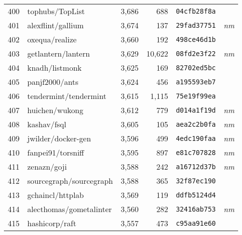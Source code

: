 {\begin{supertabular}{llrrll}
        400 &                    tophubs/TopList &  3,686 &    688 &  \texttt{04cfb28f8a} &              \\
        401 &                  alexflint/gallium &  3,674 &    137 &  \texttt{29fad37751} &  \textit{nm} \\
        402 &                     oxequa/realize &  3,660 &    192 &  \texttt{498ce46d1b} &              \\
        403 &                 getlantern/lantern &  3,629 & 10,622 &  \texttt{08fd2e3f22} &  \textit{nm} \\
        404 &                     knadh/listmonk &  3,625 &    169 &  \texttt{82702ed5bc} &              \\
        405 &                     panjf2000/ants &  3,624 &    456 &  \texttt{a195593eb7} &              \\
        406 &              tendermint/tendermint &  3,615 &  1,115 &  \texttt{75e19f99ea} &              \\
        407 &                     huichen/wukong &  3,612 &    779 &  \texttt{d014a1f19d} &  \textit{nm} \\
        408 &                        kashav/fsql &  3,605 &    105 &  \texttt{aea2c2b0fa} &  \textit{nm} \\
        409 &                 jwilder/docker-gen &  3,596 &    499 &  \texttt{4edc190faa} &  \textit{nm} \\
        410 &                  fanpei91/torsniff &  3,595 &    897 &  \texttt{e81c707828} &  \textit{nm} \\
        411 &                        zenazn/goji &  3,588 &    242 &  \texttt{a16712d37b} &  \textit{nm} \\
        412 &            sourcegraph/sourcegraph &  3,588 &    365 &  \texttt{32f87ec190} &              \\
        413 &                   gchaincl/httplab &  3,569 &    119 &  \texttt{ddfb5124d4} &              \\
        414 &            alecthomas/gometalinter &  3,560 &    282 &  \texttt{32416ab753} &  \textit{nm} \\
        415 &                     hashicorp/raft &  3,557 &    473 &  \texttt{c95aa91e60} &              \\

\end{supertabular}}
